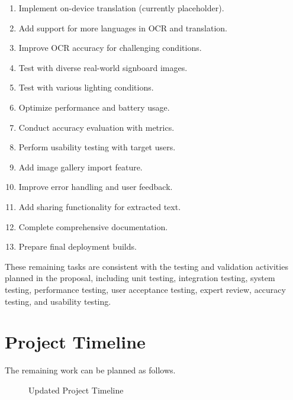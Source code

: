 \documentclass[12pt,a4paper]{report}
\begin{document}
\begin{enumerate}
    \item Implement on-device translation (currently placeholder).
    
    \item Add support for more languages in OCR and translation.
    
    \item Improve OCR accuracy for challenging conditions.
    
    \item Test with diverse real-world signboard images.
    
    \item Test with various lighting conditions.
    
    \item Optimize performance and battery usage.
    
    \item Conduct accuracy evaluation with metrics.
    
    \item Perform usability testing with target users.
    
    \item Add image gallery import feature.
    
    \item Improve error handling and user feedback.
    
    \item Add sharing functionality for extracted text.
    
    \item Complete comprehensive documentation.
    
    \item Prepare final deployment builds.
\end{enumerate}

These remaining tasks are consistent with the testing and validation activities planned in the proposal, including unit testing, integration testing, system testing, performance testing, user acceptance testing, expert review, accuracy testing, and usability testing. \cite{ref8}

\section{Project Timeline}

The remaining work can be planned as follows.

\begin{figure}[H]
    \centering
    \caption{Updated Project Timeline}
    \label{fig:project-timeline}
\end{figure}
\end{document}
